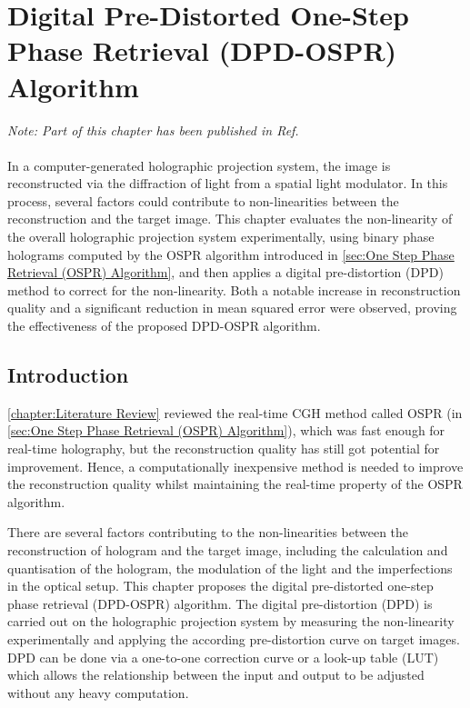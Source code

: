 \chapter{Digital Pre-Distorted One-Step Phase Retrieval (DPD-OSPR) Algorithm} \label{chapter:Digital Pre-Distorted One-Step Phase Retrieval (DPD-OSPR) Algorithm}

\graphicspath{{Chapter_DPD_OSPR/Figs/}}

\textit{Note: Part of this chapter has been published in Ref. \cite{Sha2023DPD}}\\\\

In a computer-generated holographic projection system, the image is reconstructed via the diffraction of light from a spatial light modulator. In this process, several factors could contribute to non-linearities between the reconstruction and the target image. This chapter evaluates the non-linearity of the overall holographic projection system experimentally, using binary phase holograms computed by the OSPR algorithm introduced in \cref{sec:One Step Phase Retrieval (OSPR) Algorithm}, and then applies a digital pre-distortion (DPD) method to correct for the non-linearity. Both a notable increase in reconstruction quality and a significant reduction in mean squared error were observed, proving the effectiveness of the proposed DPD-OSPR algorithm.


\section{Introduction}
\cref{chapter:Literature Review} reviewed the real-time CGH method called OSPR (in \cref{sec:One Step Phase Retrieval (OSPR) Algorithm}), which was fast enough for real-time holography, but the reconstruction quality has still got potential for improvement. Hence, a computationally inexpensive method is needed to improve the reconstruction quality whilst maintaining the real-time property of the OSPR algorithm.

There are several factors contributing to the non-linearities between the reconstruction of hologram and the target image, including the calculation and quantisation of the hologram, the modulation of the light and the imperfections in the optical setup. This chapter proposes the digital pre-distorted one-step phase retrieval (DPD-OSPR) algorithm. The digital pre-distortion (DPD) is carried out on the holographic projection system by measuring the non-linearity experimentally and applying the according pre-distortion curve on target images. DPD can be done via a one-to-one correction curve or a look-up table (LUT) which allows the relationship between the input and output to be adjusted without any heavy computation.

